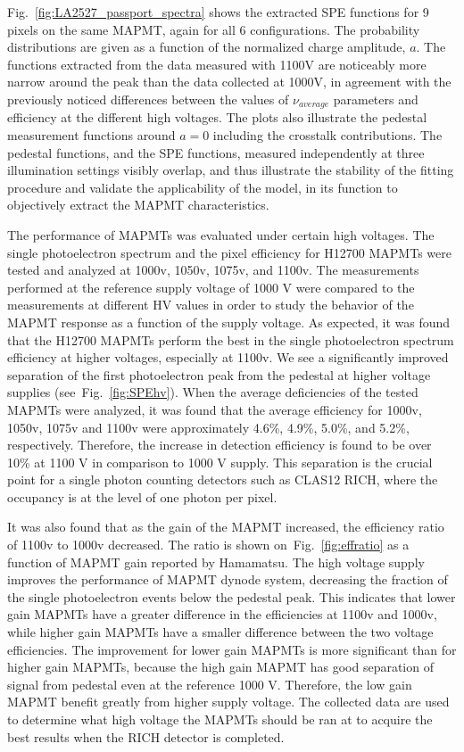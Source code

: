 Fig.~\ref{fig:LA2527_passport_spectra} shows the extracted SPE functions for 9 pixels on the same MAPMT, again for all 6 configurations. The probability distributions are given as a function of the normalized charge amplitude, $a$. The functions extracted from the data measured with 1100V are noticeably more narrow around the peak than the data collected at 1000V, in agreement with the previously noticed differences between the values of $\nu_{average}$ parameters and efficiency at the different high voltages. The plots also illustrate the pedestal measurement functions around $a=0$ including the crosstalk contributions. The pedestal functions, and the SPE functions, measured independently at three illumination settings visibly overlap, and thus illustrate the stability of the fitting procedure and validate the applicability of the model, in its function to objectively extract the MAPMT characteristics.


\iffalse
The performance of MAPMTs was evaluated under certain high voltages.
The single photoelectron spectrum and the pixel efficiency for H12700 MAPMTs were tested and analyzed at 1000v, 1050v, 1075v, and 1100v.
The measurements performed at the reference supply voltage of 1000 V were compared to the measurements at different HV values in order to study the behavior of the MAPMT response as a function of the supply voltage.
As expected, it was found that the H12700 MAPMTs perform the best in the single photoelectron spectrum efficiency at higher voltages, especially at 1100v.
We see a significantly improved separation of the first photoelectron peak from the pedestal at higher voltage supplies (see~Fig.~\ref{fig:SPEhv}).
When the average deficiencies of the tested MAPMTs were analyzed, it was found that the average efficiency for 1000v, 1050v, 1075v and 1100v were approximately 4.6\%, 4.9\%, 5.0\%, and 5.2\%, respectively.
Therefore, the increase in detection efficiency is found to be over 10\% at 1100 V in comparison to 1000 V supply.
This separation is the crucial point for a single photon counting detectors such as CLAS12 RICH, where the occupancy is at the level of one photon per pixel.



It was also found that as the gain of the MAPMT increased, the efficiency ratio of 1100v to 1000v decreased.
The ratio is shown on~Fig.~\ref{fig:effratio} as a function of MAPMT gain reported by Hamamatsu.
The high voltage supply improves the performance of MAPMT dynode system, decreasing the fraction of the single photoelectron events below the pedestal peak.
This indicates that lower gain MAPMTs have a greater difference in the efficiencies at 1100v and 1000v, while higher gain MAPMTs have a smaller difference between the two voltage efficiencies.
The improvement for lower gain MAPMTs is more significant than for higher gain MAPMTs, because the high gain MAPMT has good separation of signal from pedestal even at the reference 1000 V.
Therefore, the low gain MAPMT benefit greatly from higher supply voltage.
The collected data are used to determine what high voltage the MAPMTs should be ran at to acquire the best results when the RICH detector is completed.


